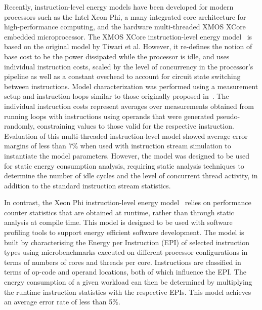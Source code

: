 
Recently, instruction-level energy models have been developed for modern
processors such as the Intel Xeon Phi, a many integrated core architecture for
high-performance computing, and the hardware multi-threaded XMOS XCore embedded
microprocessor.
%
The XMOS XCore instruction-level energy
model~\cite{DBLP:journals/tecs/KerrisonE15} is based on the original model by
Tiwari et al. However, it re-defines the notion of base cost to be the power dissipated
while the processor is idle, and  uses individual instruction costs, scaled by
the level of concurrency in the processor's pipeline as well as a constant overhead to
account for circuit state switching between instructions.
%
Model characterization was performed using a measurement setup and instruction
loops similar to those originally proposed in~\cite{Tiwari-embedded-1994}. The
individual instruction costs represent averages over measurements obtained from
running loops with instructions using operands that were generated
pseudo-randomly, constraining values to those valid for the respective
instruction.
%
Evaluation of this multi-threaded instruction-level model showed average error
margins of less than 7\% when used with instruction stream simulation to
instantiate the model parameters.
%
However, the model was designed to be used for static energy consumption analysis,
requiring static analysis techniques to determine the number of idle cycles and
the level of concurrent thread activity, in addition to the standard
instruction stream statistics.

In contrast, the Xeon Phi instruction-level energy model~\cite{phimodel} relies
on performance counter statistics that are obtained at runtime, rather than
through static analysis at compile time. This model is designed to be used with
software profiling tools to support energy efficient software development. The
model is built by characterising the Energy per Instruction (EPI) of selected
instruction types using microbenchmarks executed on different processor
configurations in terms of numbers of cores and threads per core. Instructions
are classified in terms of op-code and operand locations, both of which
influence the EPI.
%
The energy consumption of a given workload can then be determined by
multiplying the runtime instruction statistics with the respective EPIs.
%
This model achieves an average error rate of less than 5\%.


